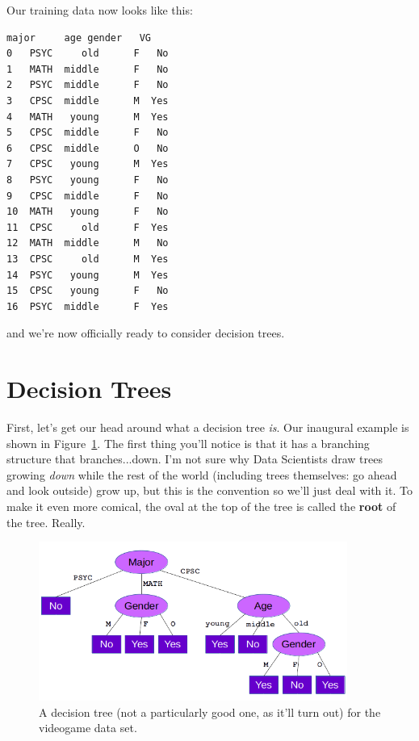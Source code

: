 Our training data now looks like this:

\begin{Verbatim}[fontsize=\small,samepage=true,frame=single,framesep=3mm,xleftmargin=4cm,xrightmargin=4cm]
   major     age gender   VG
0   PSYC     old      F   No
1   MATH  middle      F   No
2   PSYC  middle      F   No
3   CPSC  middle      M  Yes
4   MATH   young      M  Yes
5   CPSC  middle      F   No
6   CPSC  middle      O   No
7   CPSC   young      M  Yes
8   PSYC   young      F   No
9   CPSC  middle      F   No
10  MATH   young      F   No
11  CPSC     old      F  Yes
12  MATH  middle      M   No
13  CPSC     old      M  Yes
14  PSYC   young      M  Yes
15  CPSC   young      F   No
16  PSYC  middle      F  Yes
\end{Verbatim}

and we're now officially ready to consider decision trees.

\section{Decision Trees}


First, let's get our head around what a decision tree \textit{is}. Our
inaugural example is shown in Figure~\ref{fig:decisionTree}. The first thing
you'll notice is that it has a branching structure that branches...down. I'm
not sure why Data Scientists draw trees growing \textit{down} while the rest of
the world (including trees themselves: go ahead and look outside) grow up, but
this is the convention so we'll just deal with it. To make it even more
comical, the oval at the top of the tree is called the \textbf{root} of the
tree. Really.

\begin{figure}[ht]
\centering
\includegraphics[width=0.9\textwidth]{decisionTree.png}
\caption{A decision tree (not a particularly good one, as it'll turn out) for
the videogame data set.}
\label{fig:decisionTree}
\end{figure}

